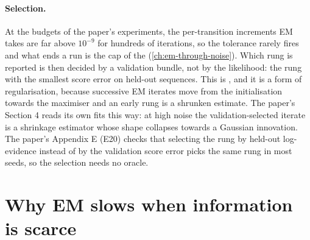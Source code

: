 \paragraph{Selection.} At the budgets of the paper's experiments, the per-transition
increments EM takes are far above $10^{-9}$ for hundreds of iterations, so the
tolerance rarely fires and what ends a run is the cap of the 
(\cref{ch:em-through-noise}). Which rung is reported is then decided by a validation
bundle, not by the likelihood: the rung with the smallest score error on held-out
sequences. This is , and it is a form of regularisation, because
successive EM iterates move from the initialisation towards the maximiser and an early
rung is a shrunken estimate. The paper's Section 4 reads its own fits this way: at
high noise the validation-selected iterate is a shrinkage estimator whose shape
collapses towards a Gaussian innovation. The paper's Appendix E (E20) checks that
selecting the rung by held-out log-evidence instead of by the validation score error
picks the same rung in most seeds, so the selection needs no oracle.

\section{Why EM slows when information is scarce}
\label{sec:ml-slow}

